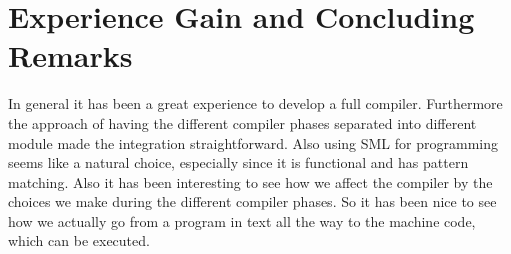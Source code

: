 \documentclass{article}
\begin{document}


\section{Experience Gain and Concluding Remarks}

In general it has been a great experience to develop a full compiler. Furthermore the approach of having the different compiler phases separated into different module made the integration straightforward. Also using SML for programming seems like a natural choice, especially since it is functional and has pattern matching. Also it has been interesting to see how we affect the compiler by the choices we make during the different compiler phases. So it has been nice to see how we actually go from a program in text all the way to the machine code, which can be executed. 
\end{document}

